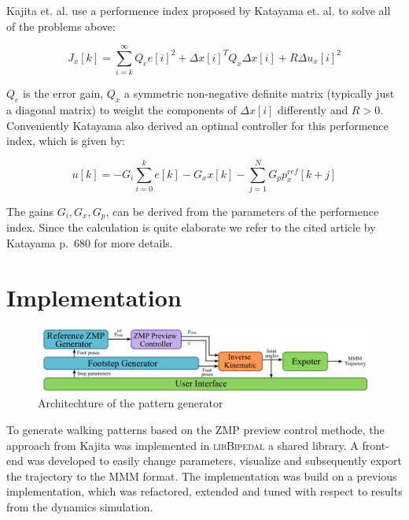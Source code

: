 \documentclass[english,ngerman]{KITreprt}
\newcommand{\name}[1]{\textsc{#1}}
\begin{document}
Kajita et. al. use a performence index proposed by Katayama et. al.
\cite{katayama1985design} to solve all of the problems above:

\begin{equation}
J_x[k] = \sum^{\infty}_{i=k} Q_e e[i]^2 + \Delta x[i]^T Q_x \Delta x[i] + R \Delta u_x[i]^2
\end{equation}

$Q_e$ is the error gain, $Q_x$ a symmetric non-negative definite matrix
(typically just a diagonal matrix) to weight the components of
$\Delta x[i]$ differently and $R > 0$. Conveniently Katayama also
derived an optimal controller for this performence index, which is given
by:

\begin{equation}
u[k] = -G_i \sum^k_{i=0} e[k] - G_x x[k] - \sum^N_{j=1} G_p p^{ref}_x[k + j]
\end{equation}

The gains $G_i, G_x, G_p$, can be derived from the parameters of the
performence index. Since the calculation is quite elaborate we refer to
the cited article by Katayama p.~680 for more details.

\section{Implementation}\label{implementation}

\begin{figure}[tb]
\vspace*{-1em}
\includegraphics[width=\textwidth]{images/pattern_generator_architechture.png}
\caption{Architechture of the pattern generator}
\label{img:pattern-generator-architechture}
\end{figure}

To generate walking patterns based on the ZMP preview control methode,
the approach from Kajita was implemented in \name{libBipedal} a shared
library. A front-end was developed to easily change parameters,
visualize and subsequently export the trajectory to the \name{MMM}
format. The implementation was build on a previous implementation, which
was refactored, extended and tuned with respect to results from the
dynamics simulation.
\end{document}
